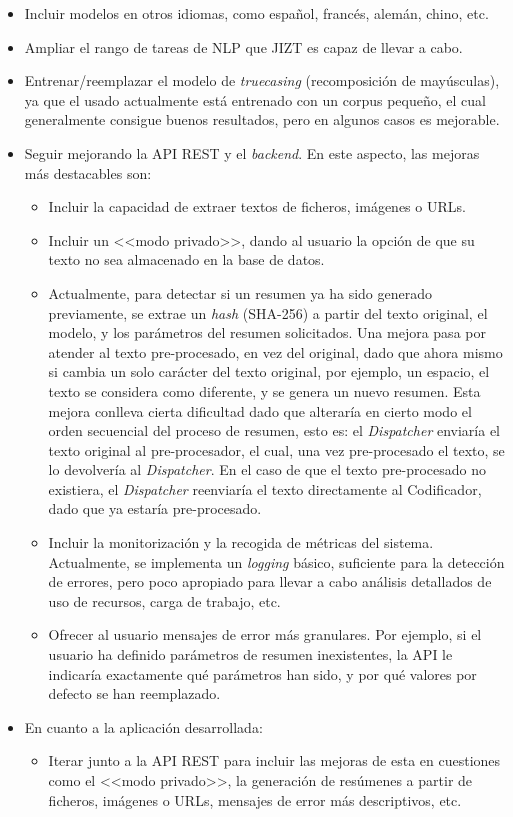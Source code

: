 \vspace{-0.3cm}
\begin{itemize}[\textbullet]
	\item Incluir modelos en otros idiomas, como español, francés, alemán, chino, etc.
	\item Ampliar el rango de tareas de NLP que JIZT es capaz de llevar a cabo.
	\item Entrenar/reemplazar el modelo de \emph{truecasing} (recomposición de mayúsculas), ya que el usado actualmente está entrenado con un corpus pequeño, el cual generalmente consigue buenos resultados, pero en algunos casos es mejorable.
	\item Seguir mejorando la API REST y el \emph{backend}. En este aspecto, las mejoras más destacables son:
	\begin{itemize}[◦]
		\item Incluir la capacidad de extraer textos de ficheros, imágenes o URLs.
		
		\item Incluir un <<modo privado>>, dando al usuario la opción de que su texto no sea almacenado en la base de datos.
		
		\item Actualmente, para detectar si un resumen ya ha sido generado previamente, se extrae un \emph{hash} (SHA-256) a partir del texto original, el modelo, y los parámetros del resumen solicitados. Una mejora pasa por atender al texto pre-procesado, en vez del original, dado que ahora mismo si cambia un solo carácter del texto original, por ejemplo, un espacio, el texto se considera como diferente, y se genera un nuevo resumen. Esta mejora conlleva cierta dificultad dado que alteraría en cierto modo el orden secuencial del proceso de resumen, esto es: el \emph{Dispatcher} enviaría el texto original al pre-procesador, el cual, una vez pre-procesado el texto, se lo devolvería al \emph{Dispatcher}. En el caso de que el texto pre-procesado no existiera, el \emph{Dispatcher} reenviaría el texto directamente al Codificador, dado que ya estaría pre-procesado.
		
		\item Incluir la monitorización y la recogida de métricas del sistema. Actualmente, se implementa un \emph{logging} básico, suficiente para la detección de errores, pero poco apropiado para llevar a cabo análisis detallados de uso de recursos, carga de trabajo, etc.
		
		\item Ofrecer al usuario mensajes de error más granulares. Por ejemplo, si el usuario ha definido parámetros de resumen inexistentes, la API le indicaría exactamente qué parámetros han sido, y por qué valores por defecto se han reemplazado.
	\end{itemize}
	\item En cuanto a la aplicación desarrollada:
	\begin{itemize}[◦]
		\item Iterar junto a la API REST para incluir las mejoras de esta en cuestiones como el <<modo privado>>, la generación de resúmenes a partir de ficheros, imágenes o URLs, mensajes de error más descriptivos, etc.
		

\end{itemize}
\end{itemize}
